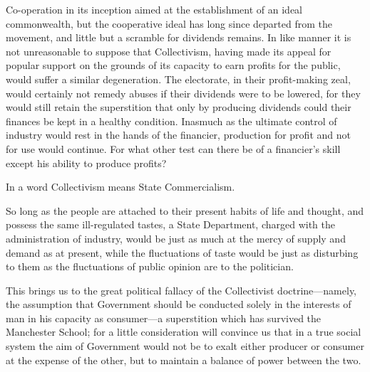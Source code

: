 \documentclass{book}
\begin{document}
Co-operation in its inception aimed at the establishment of an ideal commonwealth, but the cooperative ideal has long since departed from the movement, and little but a scramble for dividends remains. In like manner it is not unreasonable to suppose that Collectivism, having made its appeal for popular support on the grounds of its capacity to earn profits for the public, would suffer a similar degeneration. The electorate, in their profit-making zeal, would certainly not remedy abuses if their dividends were to be lowered, for they would still retain the superstition that only by producing dividends could their finances be kept in a healthy condition. Inasmuch as the ultimate control of industry would rest in the hands of the financier, production for profit and not for use would continue. For what other test can there be of a financier’s skill except his ability to produce profits?

In a word Collectivism means State Commercialism.

So long as the people are attached to their present habits of life and thought, and possess the same ill-regulated tastes, a State Department, charged with the administration of industry, would be just as much at the mercy of supply and demand as at present, while the fluctuations of taste would be just as disturbing to them as the fluctuations of public opinion are to the politician.

This brings us to the great political fallacy of the Collectivist doctrine—namely, the assumption that Government should be conducted solely in the interests of man in his capacity as consumer—a superstition which has survived the Manchester School; for a little consideration will convince us that in a true social system the aim of Government would not be to exalt either producer or consumer at the expense of the other, but to maintain a balance of power between the two.
\end{document}

